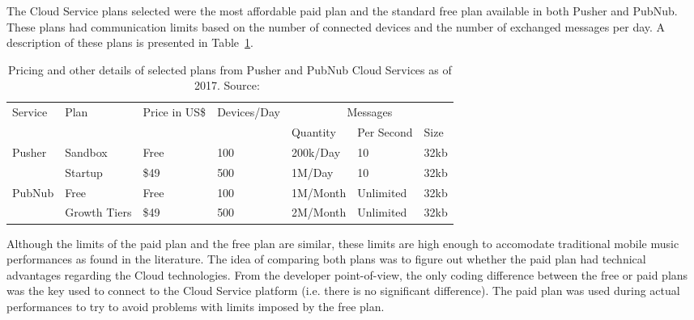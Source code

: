 The Cloud Service plans selected were the most affordable paid plan and the standard free plan available in both Pusher and PubNub.
These plans had communication limits based on the number of connected devices and the number of exchanged messages per day.
A description of these plans is presented in Table~\ref{tab:pusherpubnubplans}.


\begin{table}[]
\centering
\caption{Pricing and other details of selected plans from Pusher and PubNub Cloud Services as of 2017. Source:~\cite{Pusher2017website,PubNub2017website}}
\label{tab:pusherpubnubplans}
\begin{tabular}{l|llllll}
Service & Plan         & Price in US\$ & Devices/Day & \multicolumn{3}{c}{Messages} \\ \cline{5-7} 
        &              &               &             & Quantity & Per Second & Size \\ \hline
Pusher  & Sandbox      & Free          & 100         & 200k/Day &    10      & 32kb \\ \cline{2-7} 
        & Startup      & \$49          & 500         & 1M/Day   &    10      & 32kb \\ \hline
PubNub  & Free         & Free          & 100         & 1M/Month & Unlimited  & 32kb \\ \cline{2-7} 
        & Growth Tiers & \$49          & 500         & 2M/Month & Unlimited  & 32kb \\ \hline
\end{tabular}
\end{table}

Although the limits of the paid plan and the free plan are similar, these limits are high enough to accomodate traditional mobile music performances as found in the literature. 
The idea of comparing both plans was to figure out whether the paid plan had technical advantages regarding the Cloud technologies.
From the developer point-of-view, the only coding difference between the free or paid plans was the key used to connect to the Cloud Service platform (i.e. there is no significant difference).
The paid plan was used during actual performances to try to avoid problems with limits imposed by the free plan.


